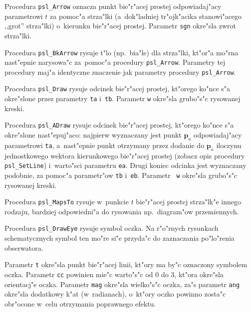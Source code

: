 \vspace{\bigskipamount}
Procedura \texttt{psl\_Arrow} oznacza punkt bie"r"acej prostej
odpowiadaj"acy parametrowi $t$ za pomoc"a strza"lki (a~dok"ladniej
tr"ojk"acika stanowi"acego ,,grot'' strza"lki) o~kierunku bie"r"acej prostej.
Parametr \texttt{sgn} okre"sla zwrot strza"lki.

\vspace{\bigskipamount}
Procedura \texttt{psl\_BkArrow} rysuje t"lo (np.\ bia"le) dla strza"lki,
kt"or"a mo"rna nast"epnie narysowa"c za~pomoc"a procedury
\texttt{psl\_Arrow}.
Parametry tej procedury maj"a identyczne znaczenie jak parametry procedury
\texttt{psl\_Arrow}.

\vspace{\bigskipamount}
Procedura \texttt{psl\_Draw} rysuje odcinek bie"r"acej prostej, kt"orego
ko"nce s"a okre"slone przez parametry \texttt{ta} i~\texttt{tb}. Parametr
\texttt{w} okre"sla grubo"s"c rysowanej kreski.

\vspace{\bigskipamount}
Procedura \texttt{psl\_ADraw} rysuje odcinek bie"r"acej prostej, kt"orego
ko"nce s"a okre"slone nast"epuj"aco: najpierw wyznaczany jest punkt
$\bm{p}_a$ odpowiadaj"acy parametrowi \texttt{ta}, a~nast"epnie punkt
otrzymany przez dodanie do $\bm{p}_a$ iloczynu jednostkowego wektora
kierunkowego bie"r"acej prostej (zobacz opis procedury \texttt{psl\_SetLine})
i~warto"sci parametru \texttt{ea}. Drugi koniec odcinka jest
wyznaczany podobnie, za pomoc"a parametr"ow \texttt{tb} i~\texttt{eb}.
Parametr ~\texttt{w} okre"sla grubo"s"c rysowanej kreski.

\vspace{\bigskipamount}
Procedura \texttt{psl\_MapsTo} rysuje w~punkcie $t$ bie"r"acej prostej
strza"lk"e innego rodzaju, bardziej odpowiedni"a do rysowania np.\
diagram"ow przemiennych.

\vspace{\bigskipamount}
Procedura \texttt{psl\_DrawEye} rysuje symbol oczka. Na r"o"rnych rysunkach
schematycznych symbol ten mo"re si"e przyda"c do zaznaczania po"lo"renia
obserwatora.

Parametr \texttt{t} okre"sla punkt bie"r"acej linii, kt"ory ma by"c
oznaczony symbolem oczka. Parametr \texttt{cc} powinien mie"c warto"s"c od
$0$ do $3$, kt"ora okre"sla orientacj"e oczka. Parametr \texttt{mag}
okre"sla wielko"s"c oczka, za"s parametr \texttt{ang} okre"sla dodatkowy
k"at (w~radianach), o~kt"ory oczko powinno zosta"c obr"ocone w~celu
otrzymania poprawnego efektu.


